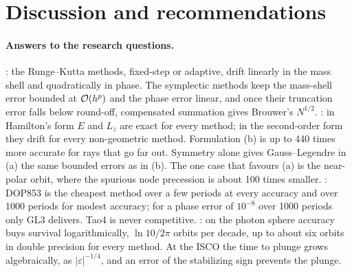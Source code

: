 \section{Discussion and recommendations}
\label{sec:discussion}

\paragraph{Answers to the research questions.}
: the Runge--Kutta methods, fixed-step or adaptive, drift linearly in the mass shell and
quadratically in phase. The symplectic methods keep the mass-shell error bounded at
$\mathcal{O}(h^p)$ and the phase error linear, and once their truncation error falls below
round-off, compensated summation gives Brouwer's $N^{1/2}$.
: in Hamilton's form $E$ and $L_z$ are exact for every method; in the second-order form
they drift for every non-geometric method. Formulation (b) is up to 440 times more accurate
for rays that go far out. Symmetry alone gives Gauss--Legendre in (a) the same bounded errors
as in (b). The one case that favours (a) is the near-polar orbit, where the spurious node
precession is about 100 times smaller.
: DOP853 is the cheapest method over a few periods at every accuracy and over 1000
periods for modest accuracy; for a phase error of $10^{-8}$ over 1000 periods only GL3
delivers. Tao4 is never competitive.
: on the photon sphere accuracy buys survival logarithmically, $\ln 10/2\pi$ orbits per
decade, up to about six orbits in double precision for every method. At the ISCO the time to
plunge grows algebraically, as $|\varepsilon|^{-1/4}$, and an error of the stabilizing sign
prevents the plunge.

